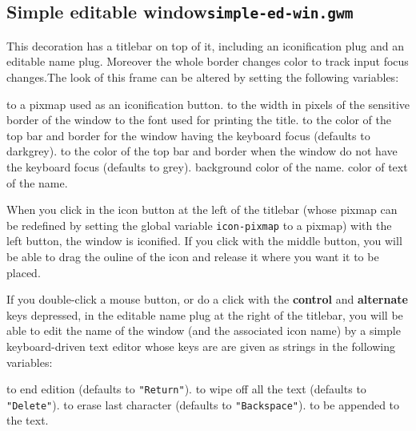 \subsection{Simple editable window\hfill{\tt simple-ed-win.gwm}}
\label{simple-ed-win}

\centerline{}

This decoration has a titlebar on top of it, including an iconification
plug and an editable name plug. Moreover the whole border changes color to
track input focus changes.The look of this
frame can be altered by setting the following variables:

\begin{description}
 to a pixmap used as an iconification button.
 to the width in pixels of the 
sensitive border of the window
 to the font used for printing the title.
 to the color of the top bar and border
 for the window having the keyboard focus (defaults to darkgrey).
 to the color of the top bar and border
when the window do not have the keyboard focus (defaults to grey).
 background color of the name.
 color of text of the name.
\end{description}

When you click in the icon button at the left of the titlebar (whose pixmap
can be redefined by setting the global variable \verb"icon-pixmap" to a
pixmap) with the left button, the window is iconified. If you click with the
middle button, you will be able to drag the ouline of the icon and release
it where you want it to be placed.

If you double-click a mouse button, or do a click with the {\bf control} and
{\bf alternate} keys depressed, in the editable name plug at the right of
the titlebar, you will be able to edit the name of the window (and the
associated icon name) by a simple keyboard-driven text editor whose keys
are are given as strings in the following variables:

\begin{description}
 to end edition (defaults to \verb|"Return"|).
 to wipe off all the text (defaults to 
\verb|"Delete"|).
 to erase last character (defaults to 
\verb|"Backspace"|).
 to be appended to the text.
\end{description}


